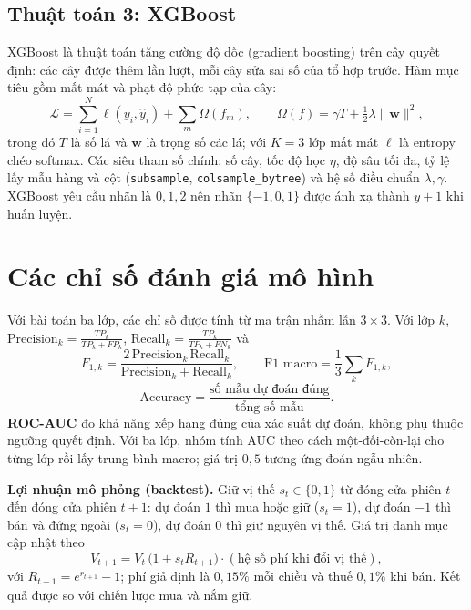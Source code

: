 \documentclass[12pt,a4paper,oneside]{report}
\begin{document}
\subsection{Thuật toán 3: XGBoost}
XGBoost \cite{chen2016} là thuật toán tăng cường độ dốc (gradient boosting) trên
cây quyết định: các cây được thêm lần lượt, mỗi cây sửa sai số của tổ hợp trước.
Hàm mục tiêu gồm mất mát và phạt độ phức tạp của cây:
\begin{equation}
  \mathcal{L}=\sum_{i=1}^{N} \ell(y_i,\hat{y}_i)+\sum_{m}\Omega(f_m),\qquad
  \Omega(f)=\gamma T+\tfrac{1}{2}\lambda\lVert\mathbf{w}\rVert^2,
  \label{eq:xgb}
\end{equation}
trong đó $T$ là số lá và $\mathbf{w}$ là trọng số các lá; với $K=3$ lớp mất mát
$\ell$ là entropy chéo softmax. Các siêu tham số chính: số cây, tốc độ học $\eta$,
độ sâu tối đa, tỷ lệ lấy mẫu hàng và cột (\texttt{subsample},
\texttt{colsample\_bytree}) và hệ số điều chuẩn $\lambda,\gamma$. XGBoost yêu cầu
nhãn là $0,1,2$ nên nhãn $\{-1,0,1\}$ được ánh xạ thành $y+1$ khi huấn luyện.

\section{Các chỉ số đánh giá mô hình}
Với bài toán ba lớp, các chỉ số được tính từ ma trận nhầm lẫn $3\times 3$. Với lớp
$k$, $\mathrm{Precision}_k=\frac{TP_k}{TP_k+FP_k}$, $\mathrm{Recall}_k=\frac{TP_k}{TP_k+FN_k}$ và
\begin{equation}
  F_{1,k}=\frac{2\,\mathrm{Precision}_k\,\mathrm{Recall}_k}{\mathrm{Precision}_k+\mathrm{Recall}_k},\qquad
  \text{F1 macro}=\frac{1}{3}\sum_{k} F_{1,k},
  \label{eq:f1}
\end{equation}
\begin{equation}
  \mathrm{Accuracy}=\frac{\text{số mẫu dự đoán đúng}}{\text{tổng số mẫu}}.
  \label{eq:acc}
\end{equation}
\textbf{ROC-AUC} đo khả năng xếp hạng đúng của xác suất dự đoán, không phụ thuộc
ngưỡng quyết định. Với ba lớp, nhóm tính AUC theo cách một-đối-còn-lại cho từng
lớp rồi lấy trung bình macro; giá trị $0{,}5$ tương ứng đoán ngẫu nhiên.

\textbf{Lợi nhuận mô phỏng (backtest).} Giữ vị thế $s_t\in\{0,1\}$ từ đóng cửa
phiên $t$ đến đóng cửa phiên $t+1$: dự đoán $1$ thì mua hoặc giữ ($s_t=1$), dự
đoán $-1$ thì bán và đứng ngoài ($s_t=0$), dự đoán $0$ thì giữ nguyên vị thế. Giá
trị danh mục cập nhật theo
\begin{equation}
  V_{t+1}=V_t\,\bigl(1+s_t R_{t+1}\bigr)\cdot(\text{hệ số phí khi đổi vị thế}),
  \label{eq:backtest}
\end{equation}
với $R_{t+1}=e^{r_{t+1}}-1$; phí giả định là $0{,}15\%$ mỗi chiều và thuế
$0{,}1\%$ khi bán. Kết quả được so với chiến lược mua và nắm giữ.
\end{document}

